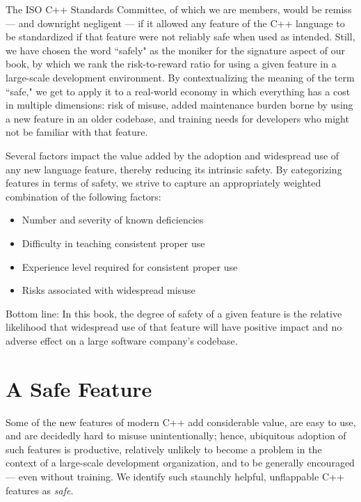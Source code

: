 The ISO C++ Standards Committee, of which we are members, would be remiss --- and downright negligent --- if it allowed any feature of the C++ language to be standardized if that feature were not reliably safe when used as intended. Still, we have chosen the word ``safely" as the moniker for the signature aspect of our book, by which we rank the risk-to-reward ratio for using a given feature in a large-scale development environment. By contextualizing the meaning of the term ``safe," we get to apply it to a real-world economy in which everything has a cost in multiple dimensions: risk of misuse, added maintenance burden borne by using a new feature in an older codebase, and training needs for developers who might not be familiar with that feature.

Several factors impact the value added by the adoption and widespread use of any new language feature, thereby reducing its intrinsic safety. By categorizing features in terms of safety, we strive to capture an appropriately weighted combination of the following factors:
\begin{itemize}
\item{Number and severity of known deficiencies}
\item{Difficulty in teaching consistent proper use}
\item{Experience level required for consistent proper use}
\item{Risks associated with widespread misuse}
\end{itemize}
Bottom line: In this book, the degree of safety of a given feature is the relative likelihood that widespread use of that feature will have positive impact and no adverse effect on a large software company’s codebase.

\section[A {\sffamily\itshape Safe} Feature]{A {\sfbsectionitalRomeo Safe} Feature}

Some of the new features of modern C++ add considerable value, are easy to use, and are decidedly hard to misuse unintentionally; hence, ubiquitous adoption of such features is productive, relatively unlikely to become a problem in the context of 
 a large-scale development organization, and to be generally encouraged --- even without training. We identify such staunchly helpful, unflappable C++ features as \emph{safe}.%

